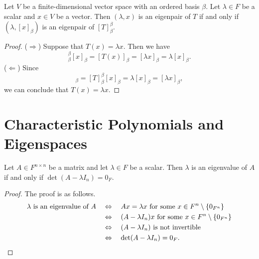 \begin{theorem}
  Let $V$ be a finite-dimensional vector space with an ordered basis $\beta$.
  Let $\lambda \in F$ be a scalar and $x \in V$ be a vector.
  Then $(\lambda, x)$ is an eigenpair of $T$ if and only if
  $(\lambda, [x]_\beta)$ is an eigenpair of $[T]_\beta^\beta$.
\end{theorem}
\begin{proof}
  ($\Rightarrow$)
  Suppose that $T(x) = \lambda x$.
  Then we have
  \begin{equation*}
    [T]_\beta^\beta[x]_\beta
    = [T(x)]_\beta
    = [\lambda x]_\beta
    = \lambda [x]_\beta.
  \end{equation*}
  ($\Leftarrow$)
  Since
  \begin{equation*}
    [T(x)]_\beta
    = [T]_\beta^\beta[x]_\beta
    = \lambda[x]_\beta
    = [\lambda x]_\beta,
  \end{equation*}
  we can conclude that $T(x) = \lambda x$.
\end{proof}

\section{Characteristic Polynomials and Eigenspaces}
\begin{theorem}
  \label{thm:eigenvalue-condition}
  Let $A \in F^{n \times n}$ be a matrix and let $\lambda \in F$ be a scalar.
  Then $\lambda$ is an eigenvalue of $A$ if and only if
  $\det(A - \lambda I_n) = 0_F$.
\end{theorem}
\begin{proof}
  The proof is as follows.
  \begin{align*}
    \text{$\lambda$ is an eigenvalue of $A$}
    &\quad \Leftrightarrow \quad
    \text{$Ax = \lambda x$ for some $x \in F^n \setminus \{0_{F^n}\}$} \\
    &\quad \Leftrightarrow \quad
    \text{$(A - \lambda I_n)x$ for some $x \in F^n \setminus \{0_{F^n}\}$} \\
    &\quad \Leftrightarrow \quad
    \text{$(A - \lambda I_n)$ is not invertible} \\
    &\quad \Leftrightarrow \quad \det(A - \lambda I_n) = 0_F.
    \qedhere
  \end{align*}
\end{proof}

